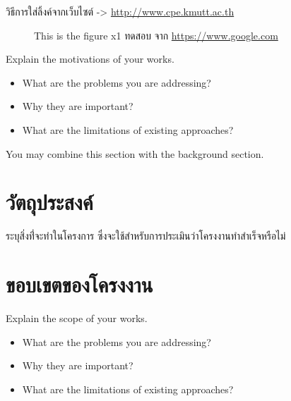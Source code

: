 \documentclass[12pt,oneside,openright,a4paper]{cpe-thai-project}
\begin{document}
วิธีการใส่ลิ้งค์จากเว็บไซต์ ->
\href{http://www.cpe.kmutt.ac.th} {http://www.cpe.kmutt.ac.th}

\cite{bworld}

\begin{figure}[!h]
  \centering
  \caption{This is the figure x1 ทดสอบ จาก \href{https://www.google.com} {https://www.google.com}}\label{fig:x1}
\end{figure}


Explain the motivations of your works.
\begin{itemize}
  \item   What are the problems you are addressing?
  \item  Why they are important?
  \item  What are the limitations of existing approaches?
\end{itemize}
You may combine this section with the background section.



\section{วัตถุประสงค์}

ระบุสิ่งท่ี่จะทำในโครงการ ซึ่งจะใช้สำหรับการประเมินว่าโครงงานทำสำเร็จหรือไม่

\section{ขอบเขตของโครงงาน}

Explain the scope of your works.
\begin{itemize}
  \item   What are the problems you are addressing?
  \item  Why they are important?
  \item  What are the limitations of existing approaches?
\end{itemize}
\end{document}
